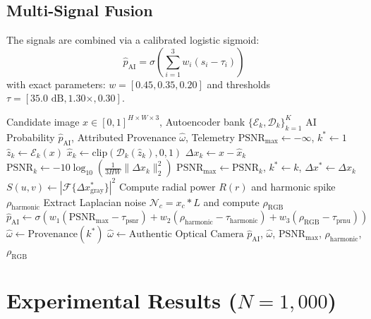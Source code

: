 \documentclass[conference]{IEEEtran}
\begin{document}
\subsection{Multi-Signal Fusion}
The signals are combined via a calibrated logistic sigmoid:
\begin{equation}
\hat{p}_{\text{AI}} = \sigma\left( \sum_{i=1}^3 w_i (s_i - \tau_i) \right)
\end{equation}
with exact parameters: $w = [0.45, 0.35, 0.20]$ and thresholds $\tau = [35.0\text{ dB}, 1.30\times, 0.30]$.

\begin{algorithm}[t]
\caption{Latent Resonance Forensic Pipeline}
\label{alg:wacv_pipe}
\begin{algorithmic}[1]
\REQUIRE Candidate image $x \in [0, 1]^{H \times W \times 3}$, Autoencoder bank $\{\mathcal{E}_k, \mathcal{D}_k\}_{k=1}^K$
\ENSURE AI Probability $\hat{p}_{\text{AI}}$, Attributed Provenance $\hat{\omega}$, Telemetry
\STATE $\text{PSNR}_{\max} \leftarrow -\infty$, $k^* \leftarrow 1$
    \STATE $\hat{z}_k \leftarrow \mathcal{E}_k(x)$ 
    \STATE $\hat{x}_k \leftarrow \text{clip}(\mathcal{D}_k(\hat{z}_k), 0, 1)$
    \STATE $\Delta x_k \leftarrow x - \hat{x}_k$
    \STATE $\text{PSNR}_k \leftarrow -10 \log_{10}(\frac{1}{3HW}\|\Delta x_k\|_2^2)$
        \STATE $\text{PSNR}_{\max} \leftarrow \text{PSNR}_k$, $k^* \leftarrow k$, $\Delta x^* \leftarrow \Delta x_k$
    \ENDIF
\ENDFOR
\STATE $S(u, v) \leftarrow |\mathcal{F}\{\Delta x^*_{\text{gray}}\}|^2$
\STATE Compute radial power $R(r)$ and harmonic spike $\rho_{\text{harmonic}}$
\STATE Extract Laplacian noise $\mathcal{N}_c = x_c * L$ and compute $\rho_{\text{RGB}}$
\STATE $\hat{p}_{\text{AI}} \leftarrow \sigma\left( w_1 (\text{PSNR}_{\max} - \tau_{\text{psnr}}) + w_2 (\rho_{\text{harmonic}} - \tau_{\text{harmonic}}) + w_3 (\rho_{\text{RGB}} - \tau_{\text{prnu}}) \right)$
    \STATE $\hat{\omega} \leftarrow \text{Provenance}(k^*)$
\ELSE
    \STATE $\hat{\omega} \leftarrow \text{Authentic Optical Camera}$
\ENDIF
\RETURN $\hat{p}_{\text{AI}}$, $\hat{\omega}$, $\text{PSNR}_{\max}$, $\rho_{\text{harmonic}}$, $\rho_{\text{RGB}}$
\end{algorithmic}
\end{algorithm}

\section{Experimental Results ($N=1,000$)}
\label{sec:experiments}
\end{document}
